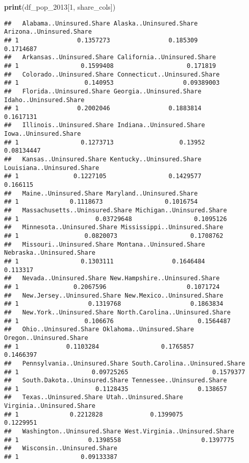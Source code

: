 \documentclass[
]{article}
\newenvironment{Shaded}{\begin{snugshade}}{\end{snugshade}}
\newcommand{\DecValTok}[1]{\textcolor[rgb]{0.00,0.00,0.81}{#1}}
\newcommand{\FunctionTok}[1]{\textcolor[rgb]{0.13,0.29,0.53}{\textbf{#1}}}
\newcommand{\NormalTok}[1]{#1}
\begin{document}
\begin{Shaded}
\begin{Highlighting}[]
\FunctionTok{print}\NormalTok{(df\_pop\_2013[}\DecValTok{1}\NormalTok{, share\_cols])}
\end{Highlighting}
\end{Shaded}

\begin{verbatim}
##   Alabama..Uninsured.Share Alaska..Uninsured.Share Arizona..Uninsured.Share
## 1                0.1357273                0.185309                0.1714687
##   Arkansas..Uninsured.Share California..Uninsured.Share
## 1                 0.1599408                    0.171819
##   Colorado..Uninsured.Share Connecticut..Uninsured.Share
## 1                  0.140953                   0.09389003
##   Florida..Uninsured.Share Georgia..Uninsured.Share Idaho..Uninsured.Share
## 1                0.2002046                0.1883814              0.1617131
##   Illinois..Uninsured.Share Indiana..Uninsured.Share Iowa..Uninsured.Share
## 1                 0.1273713                  0.13952            0.08134447
##   Kansas..Uninsured.Share Kentucky..Uninsured.Share Louisiana..Uninsured.Share
## 1               0.1227105                 0.1429577                   0.166115
##   Maine..Uninsured.Share Maryland..Uninsured.Share
## 1              0.1118673                 0.1016754
##   Massachusetts..Uninsured.Share Michigan..Uninsured.Share
## 1                     0.03729648                 0.1095126
##   Minnesota..Uninsured.Share Mississippi..Uninsured.Share
## 1                  0.0820073                    0.1708762
##   Missouri..Uninsured.Share Montana..Uninsured.Share Nebraska..Uninsured.Share
## 1                 0.1303111                0.1646484                  0.113317
##   Nevada..Uninsured.Share New.Hampshire..Uninsured.Share
## 1               0.2067596                      0.1071724
##   New.Jersey..Uninsured.Share New.Mexico..Uninsured.Share
## 1                   0.1319768                   0.1863834
##   New.York..Uninsured.Share North.Carolina..Uninsured.Share
## 1                  0.106676                       0.1564487
##   Ohio..Uninsured.Share Oklahoma..Uninsured.Share Oregon..Uninsured.Share
## 1             0.1103284                 0.1765857               0.1466397
##   Pennsylvania..Uninsured.Share South.Carolina..Uninsured.Share
## 1                    0.09725265                       0.1579377
##   South.Dakota..Uninsured.Share Tennessee..Uninsured.Share
## 1                     0.1128435                   0.138657
##   Texas..Uninsured.Share Utah..Uninsured.Share Virginia..Uninsured.Share
## 1              0.2212828             0.1399075                 0.1229951
##   Washington..Uninsured.Share West.Virginia..Uninsured.Share
## 1                   0.1398558                      0.1397775
##   Wisconsin..Uninsured.Share
## 1                 0.09133387
\end{verbatim}
\end{document}
